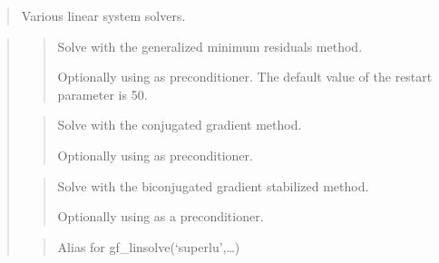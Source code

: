 \documentclass[a4paper,11pt,english]{sphinxmanual}
\begin{document}
\begin{quote}

Various linear system solvers.
\end{quote}

\begin{quote}

\begin{quote}

Solve  with the generalized minimum residuals method.

Optionally using  as preconditioner. The default value of the
restart parameter is 50.
\end{quote}

\begin{quote}

Solve  with the conjugated gradient method.

Optionally using  as preconditioner.
\end{quote}

\begin{quote}

Solve  with the bi\sphinxhyphen{}conjugated gradient stabilized method.

Optionally using  as a preconditioner.
\end{quote}

\begin{quote}

Alias for gf\_linsolve(‘superlu’,…)
\end{quote}


\end{quote}
\end{document}
